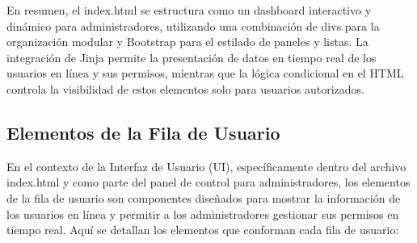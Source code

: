 \documentclass{report}
\begin{document}
En resumen, el index.html se estructura como un dashboard interactivo y dinámico para administradores, utilizando una combinación de 
divs para la organización modular y Bootstrap para el estilado de paneles y listas. La integración de Jinja permite la presentación de datos 
en tiempo real de los usuarios en línea y sus permisos, mientras que la lógica condicional en el HTML controla la visibilidad de estos elementos 
solo para usuarios autorizados.

\subsection{Elementos de la Fila de Usuario}
En el contexto de la Interfaz de Usuario (UI), específicamente dentro del archivo index.html y como parte del panel de control 
para administradores, los elementos de la fila de usuario son componentes diseñados para mostrar la información de los usuarios en 
línea y permitir a los administradores gestionar sus permisos en tiempo real.
Aquí se detallan los elementos que conforman cada fila de usuario:
\end{document}
